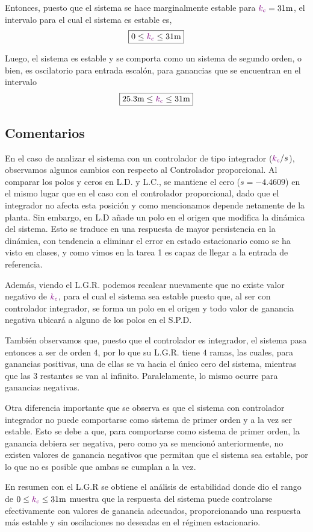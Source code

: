 Entonces, puesto que el sistema se hace marginalmente estable para $\mora{k_{c}} = 31\unit{m}$,
el intervalo para el cual el sistema es estable es,
\begin{equation}
    \boxed{0 \leq \mora{k_{c}} \leq 31\unit{m}}
\end{equation}

Luego, el sistema es estable y se comporta como un sistema de segundo orden, o
bien, es oscilatorio para entrada escalón, para ganancias que se encuentran en
el intervalo
\begin{equation}
    \boxed{25.3\unit{m} \leq \mora{k_{c}} \leq 31\unit{m}}
\end{equation}

\subsection{Comentarios}


 En el caso de analizar el sistema con un controlador de tipo integrador (\(\mathbin{\color{violet}k_c}/s\)), observamos algunos cambios con respecto al Controlador proporcional. Al comparar los polos y ceros en L.D. y L.C., se mantiene el cero ($s = -4.4609$) en el mismo lugar que en el caso con el controlador proporcional, dado que el integrador no afecta esta posición y como mencionamos depende netamente de la planta. Sin embargo, en L.D añade un polo en el origen que modifica la dinámica del sistema. Esto se traduce en una respuesta de mayor persistencia en la dinámica, con tendencia a eliminar el error en estado estacionario como se ha visto en clases, y como vimos en la tarea 1 es capaz de llegar a la entrada de referencia.

Además, viendo el L.G.R. podemos recalcar nuevamente que no existe valor negativo de $\mathbin{\color{violet}k_{c}}$, para el cual el sistema sea estable puesto que, al ser con controlador integrador, se forma un polo en el origen y 
todo valor de ganancia negativa ubicará a alguno de los polos en el S.P.D.

También observamos que, puesto que el controlador es integrador, el sistema
pasa entonces a ser de orden $4$, por lo que su L.G.R. tiene $4$ ramas, las
cuales, para ganancias positivas, una de ellas se va hacia el único cero del
sistema, mientras que las $3$ restantes se van al infinito. Paralelamente, lo
mismo ocurre para ganancias negativas.

Otra diferencia importante que se observa es que el sistema con controlador
integrador no puede comportarse como sistema de primer orden y a la vez ser
estable. Esto se debe a que, para comportarse como sistema de primer orden,
la ganancia debiera ser negativa, pero como ya se mencionó anteriormente,
no existen valores de ganancia negativos que permitan que el sistema sea
estable, por lo que no es posible que ambas se cumplan a la vez.

En resumen con el L.G.R se obtiene el análisis de estabilidad donde dio el 
rango de \(0 \leq \mora{k_{c}} \leq 31\unit{m}\) muestra que la respuesta del 
sistema puede controlarse efectivamente con valores de ganancia adecuados, 
proporcionando una respuesta más estable y sin oscilaciones no deseadas en el 
régimen estacionario.


